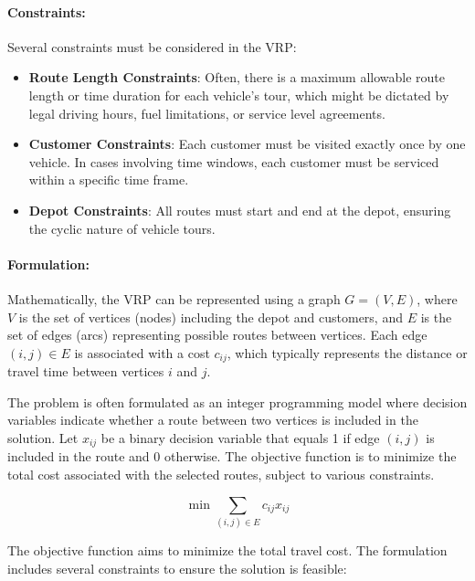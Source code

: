 \documentclass{article}
\begin{document}
    \paragraph{Constraints:}
    Several constraints must be considered in the VRP:
    \begin{itemize}
        \item \textbf{Route Length Constraints}: Often, there is a maximum allowable route length or time duration for each vehicle's tour, which might be dictated by legal driving hours, fuel limitations, or service level agreements.\cite[p. 4--5]{toth2014vehicle}
        \item \textbf{Customer Constraints}: Each customer must be visited exactly once by one vehicle. In cases involving time windows, each customer must be serviced within a specific time frame. \cite[p. 4--5]{toth2014vehicle}
        \item \textbf{Depot Constraints}: All routes must start and end at the depot, ensuring the cyclic nature of vehicle tours.\cite[p. 4--5]{toth2014vehicle}
    \end{itemize}

    \paragraph{Formulation:}
    Mathematically, the VRP can be represented using a graph \( G = (V, E) \), where \( V \) is the set of vertices (nodes) including the depot and customers, and \( E \) is the set of edges (arcs) representing possible routes between vertices. Each edge \( (i, j) \in E \) is associated with a cost \( c_{ij} \), which typically represents the distance or travel time between vertices \( i \) and \( j \).

    The problem is often formulated as an integer programming model where decision variables indicate whether a route between two vertices is included in the solution. Let \( x_{ij} \) be a binary decision variable that equals 1 if edge \( (i, j) \) is included in the route and 0 otherwise. The objective function is to minimize the total cost associated with the selected routes, subject to various constraints.\cite[pp. 3--5, 62--65]{toth2014vehicle}


    \begin{equation}
        \min \sum_{(i,j) \in E} c_{ij} x_{ij}
    \end{equation}

    The objective function aims to minimize the total travel cost. The formulation includes several constraints to ensure the solution is feasible:
\end{document}
